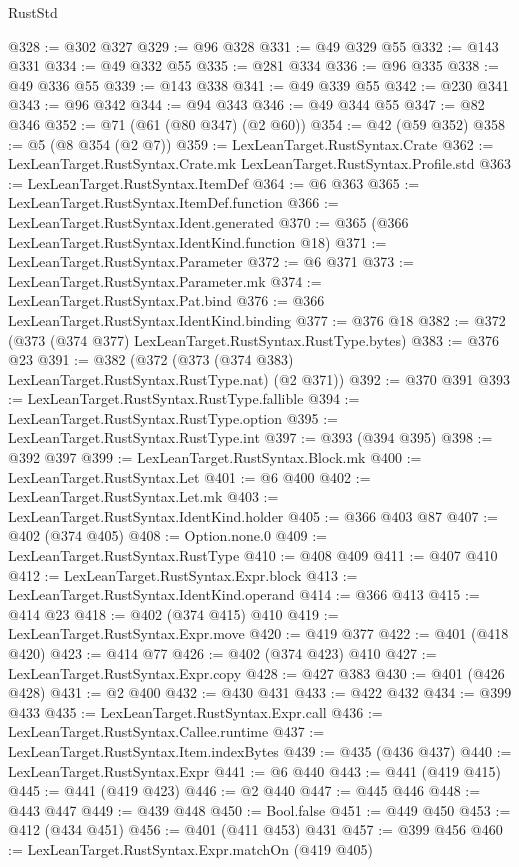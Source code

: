 \begin{lexlean}{RustStd}
\begin{coremodule}
{\begin{coremodule}
{{{{{@328 := @302 @327
@329 := @96 @328
@331 := @49 @329 @55
@332 := @143 @331
@334 := @49 @332 @55
@335 := @281 @334
@336 := @96 @335
@338 := @49 @336 @55
@339 := @143 @338
@341 := @49 @339 @55
@342 := @230 @341
@343 := @96 @342
@344 := @94 @343
@346 := @49 @344 @55
@347 := @82 @346
@352 := @71 (@61 (@80 @347) (@2 @60))
@354 := @42 (@59 @352)
@358 := @5 (@8 @354 (@2 @7))
@359 := LexLeanTarget.RustSyntax.Crate
@362 := LexLeanTarget.RustSyntax.Crate.mk LexLeanTarget.RustSyntax.Profile.std
@363 := LexLeanTarget.RustSyntax.ItemDef
@364 := @6 @363
@365 := LexLeanTarget.RustSyntax.ItemDef.function
@366 := LexLeanTarget.RustSyntax.Ident.generated
@370 := @365 (@366 LexLeanTarget.RustSyntax.IdentKind.function @18)
@371 := LexLeanTarget.RustSyntax.Parameter
@372 := @6 @371
@373 := LexLeanTarget.RustSyntax.Parameter.mk
@374 := LexLeanTarget.RustSyntax.Pat.bind
@376 := @366 LexLeanTarget.RustSyntax.IdentKind.binding
@377 := @376 @18
@382 := @372 (@373 (@374 @377) LexLeanTarget.RustSyntax.RustType.bytes)
@383 := @376 @23
@391 := @382 (@372 (@373 (@374 @383) LexLeanTarget.RustSyntax.RustType.nat) (@2 @371))
@392 := @370 @391
@393 := LexLeanTarget.RustSyntax.RustType.fallible
@394 := LexLeanTarget.RustSyntax.RustType.option
@395 := LexLeanTarget.RustSyntax.RustType.int
@397 := @393 (@394 @395)
@398 := @392 @397
@399 := LexLeanTarget.RustSyntax.Block.mk
@400 := LexLeanTarget.RustSyntax.Let
@401 := @6 @400
@402 := LexLeanTarget.RustSyntax.Let.mk
@403 := LexLeanTarget.RustSyntax.IdentKind.holder
@405 := @366 @403 @87
@407 := @402 (@374 @405)
@408 := Option.none.{0}
@409 := LexLeanTarget.RustSyntax.RustType
@410 := @408 @409
@411 := @407 @410
@412 := LexLeanTarget.RustSyntax.Expr.block
@413 := LexLeanTarget.RustSyntax.IdentKind.operand
@414 := @366 @413
@415 := @414 @23
@418 := @402 (@374 @415) @410
@419 := LexLeanTarget.RustSyntax.Expr.move
@420 := @419 @377
@422 := @401 (@418 @420)
@423 := @414 @77
@426 := @402 (@374 @423) @410
@427 := LexLeanTarget.RustSyntax.Expr.copy
@428 := @427 @383
@430 := @401 (@426 @428)
@431 := @2 @400
@432 := @430 @431
@433 := @422 @432
@434 := @399 @433
@435 := LexLeanTarget.RustSyntax.Expr.call
@436 := LexLeanTarget.RustSyntax.Callee.runtime
@437 := LexLeanTarget.RustSyntax.Item.indexBytes
@439 := @435 (@436 @437)
@440 := LexLeanTarget.RustSyntax.Expr
@441 := @6 @440
@443 := @441 (@419 @415)
@445 := @441 (@419 @423)
@446 := @2 @440
@447 := @445 @446
@448 := @443 @447
@449 := @439 @448
@450 := Bool.false
@451 := @449 @450
@453 := @412 (@434 @451)
@456 := @401 (@411 @453) @431
@457 := @399 @456
@460 := LexLeanTarget.RustSyntax.Expr.matchOn (@419 @405)
}}}}}
\end{coremodule}}
\end{coremodule}
\end{lexlean}

